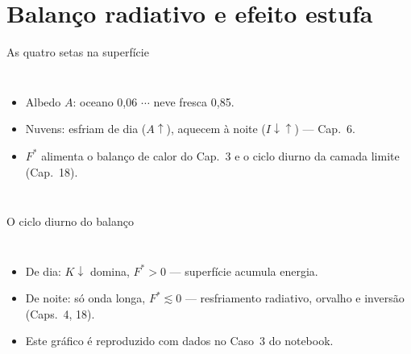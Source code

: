 \documentclass[aspectratio=169,11pt]{beamer}
\begin{document}
\section{Balanço radiativo e efeito estufa}

\begin{frame}{As quatro setas na superfície}
  \begin{columns}
    \vspace{0.4em}
    \begin{itemize}
      \item Albedo $A$: oceano 0{,}06 $\cdots$ neve fresca 0{,}85.
      \item Nuvens: esfriam de dia ($A\uparrow$), aquecem à noite
            ($I\!\downarrow\uparrow$) — Cap.~6.
      \item $F^*$ alimenta o balanço de calor do Cap.~3 e o ciclo diurno
            da camada limite (Cap.~18).
    \end{itemize}
  \end{columns}
\end{frame}

\begin{frame}{O ciclo diurno do balanço}
  \begin{columns}
    \begin{itemize}
      \item De dia: $K\!\downarrow$ domina, $F^* > 0$ — superfície
            acumula energia.
      \item De noite: só onda longa, $F^* \lesssim 0$ — resfriamento
            radiativo, orvalho e inversão (Caps.~4, 18).
      \item Este gráfico é reproduzido com dados no Caso~3 do notebook.
    \end{itemize}
  \end{columns}
\end{frame}
\end{document}
